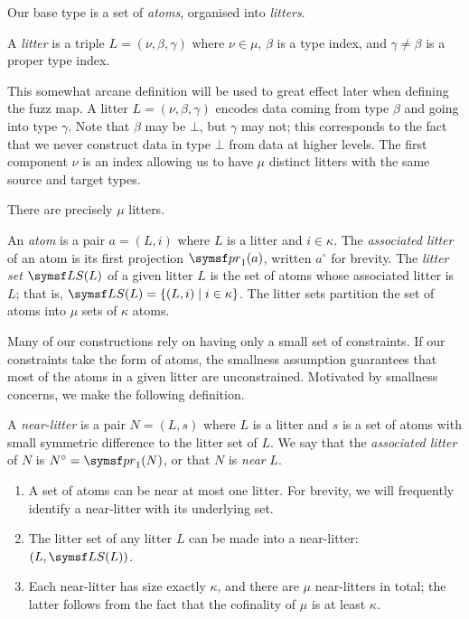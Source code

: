 Our base type is a set of \emph{atoms}, organised into \emph{litters}.
\begin{definition}
    A \emph{litter} is a triple \( L = (\nu, \beta, \gamma) \) where \( \nu \in \mu \), \( \beta \) is a type index, and \( \gamma \neq \beta \) is a proper type index.
\end{definition}
This somewhat arcane definition will be used to great effect later when defining the fuzz map.
A litter \( L = (\nu, \beta, \gamma) \) encodes data coming from type \( \beta \) and going into type \( \gamma \).
Note that \( \beta \) may be \( \bot \), but \( \gamma \) may not; this corresponds to the fact that we never construct data in type \( \bot \) from data at higher levels.
The first component \( \nu \) is an index allowing us to have \( \mu \) distinct litters with the same source and target types.
\begin{remark}
    There are precisely \( \mu \) litters.
\end{remark}
\begin{definition}
    An \emph{atom} is a pair \( a = (L, i) \) where \( L \) is a litter and \( i \in \kappa \).
    The \emph{associated litter} of an atom is its first projection \( \pr_1(a) \), written \( a^\circ \) for brevity.
    The \emph{litter set} \( \LS(L) \) of a given litter \( L \) is the set of atoms whose associated litter is \( L \); that is, \( \LS(L) = \{ (L, i) \mid i \in \kappa \} \).
    The litter sets partition the set of atoms into \( \mu \) sets of \( \kappa \) atoms.
\end{definition}
\begin{remark}
    Many of our constructions rely on having only a small set of constraints.
    If our constraints take the form of atoms, the smallness assumption guarantees that most of the atoms in a given litter are unconstrained.
    Motivated by smallness concerns, we make the following definition.
\end{remark}
\begin{definition}
    A \emph{near-litter} is a pair \( N = (L, s) \) where \( L \) is a litter and \( s \) is a set of atoms with small symmetric difference to the litter set of \( L \).
    We say that the \emph{associated litter} of \( N \) is \( N^\circ = \pr_1(N) \), or that \( N \) is \emph{near} \( L \).
\end{definition}
\begin{remarks}
    \begin{enumerate}
        \item A set of atoms can be near at most one litter.
        For brevity, we will frequently identify a near-litter with its underlying set.
        \item The litter set of any litter \( L \) can be made into a near-litter: \( (L, \LS(L)) \).
        \item Each near-litter has size exactly \( \kappa \), and there are \( \mu \) near-litters in total; the latter follows from the fact that the cofinality of \( \mu \) is at least \( \kappa \).
    \end{enumerate}
\end{remarks}
